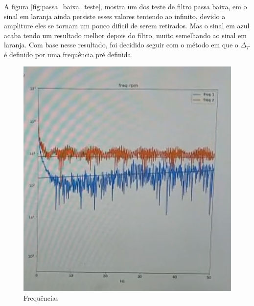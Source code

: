 A figura \ref{fig:passa_baixa_teste}, mostra um dos teste de filtro passa baixa, em o sinal em laranja ainda persiste esses valores tentendo ao infinito, devido a ampliture eles se tornam um pouco dificil de serem retirados.
Mas o sinal em azul acaba tendo um resultado melhor depois do filtro, muito semelhando ao sinal em laranja.
Com base nesse resultado, foi decidido seguir com o método em que o $\Delta_{T}$ é definido por uma frequência pré definida.

\begin{figure}[h]
	\centering
	\includegraphics{figures/frequencia_medidas_altas}
	\caption{Frequências}
	\label{fig:frequencia_medidas_altas}
\end{figure}


